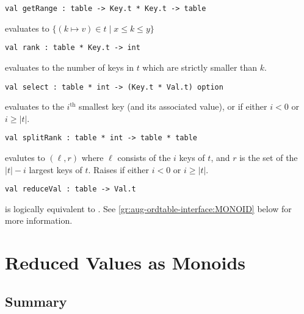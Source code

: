 \begin{gram}[getRange]
\begin{verbatim}
val getRange : table -> Key.t * Key.t -> table
\end{verbatim}
 evaluates to $\{(k \mapsto v) \in t \mathbin| x \leq k \leq y\}$
\end{gram}

\begin{gram}[rank]
\begin{verbatim}
val rank : table * Key.t -> int
\end{verbatim}
 evaluates to the number of keys in $t$ which are strictly
smaller than $k$.
\end{gram}

\begin{gram}[select]
\begin{verbatim}
val select : table * int -> (Key.t * Val.t) option
\end{verbatim}
 evaluates to the $i^\text{th}$ smallest key (and its
associated value), or  if either $i < 0$ or $i \geq |t|$.
\end{gram}

\begin{gram}[splitRank]
\begin{verbatim}
val splitRank : table * int -> table * table
\end{verbatim}
 evalutes to $(\ell,r)$ where $\ell$ consists of the $i$
keys of $t$, and $r$ is the set of the $|t|-i$ largest
keys of $t$. Raises  if either $i < 0$ or $i \geq |t|$.
\end{gram}

\begin{gram}[reduceVal]
\label{gr:aug-ordtable-interface:reduceVal}
\begin{verbatim}
val reduceVal : table -> Val.t
\end{verbatim}
 is logically equivalent to
. See
\ref{gr:aug-ordtable-interface:MONOID} below for more information.
\end{gram}


\section{Reduced Values as Monoids}

\subsection{Summary}

